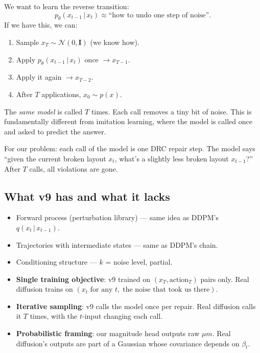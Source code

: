 \documentclass[11pt,a4paper]{article}
\newcommand{\N}{\mathcal{N}}
\newcommand{\given}{\,|\,}
\begin{document}
We want to learn the reverse transition:
\begin{equation}
p_\theta(x_{t-1} \given x_t) \approx \text{``how to undo one step of noise''}.
\end{equation}
If we have this, we can:
\begin{enumerate}[leftmargin=*]
\item Sample $x_T \sim \N(0, \mathbf{I})$ (we know how).
\item Apply $p_\theta(x_{t-1} \given x_t)$ once $\to x_{T-1}$.
\item Apply it again $\to x_{T-2}$.
\item After $T$ applications, $x_0 \sim p(x)$.
\end{enumerate}

The \emph{same model} is called $T$ times. Each call removes a tiny
bit of noise. This is fundamentally different from imitation learning,
where the model is called once and asked to predict the answer.

For our problem: each call of the model is one DRC repair step. The
model says ``given the current broken layout $x_t$, what's a slightly
less broken layout $x_{t-1}$?'' After $T$ calls, all violations are gone.

\subsection{What v9 has and what it lacks}

\begin{itemize}[leftmargin=*]
\item[\(\checkmark\)] Forward process (perturbation library) --- same idea as DDPM's $q(x_t \given x_{t-1})$.
\item[\(\checkmark\)] Trajectories with intermediate states --- same as DDPM's chain.
\item[\(\checkmark\)] Conditioning structure --- $k$ = noise level, partial.
\item[$\times$] \textbf{Single training objective}: v9 trained on $(x_T, \text{action}_T)$ pairs only. Real diffusion trains on $(x_t \text{ for any } t,\;\text{the noise that took us there})$.
\item[$\times$] \textbf{Iterative sampling}: v9 calls the model once per repair. Real diffusion calls it $T$ times, with the $t$-input changing each call.
\item[$\times$] \textbf{Probabilistic framing}: our magnitude head outputs raw $\mu m$. Real diffusion's outputs are part of a Gaussian whose covariance depends on $\beta_t$.
\end{itemize}
\end{document}
